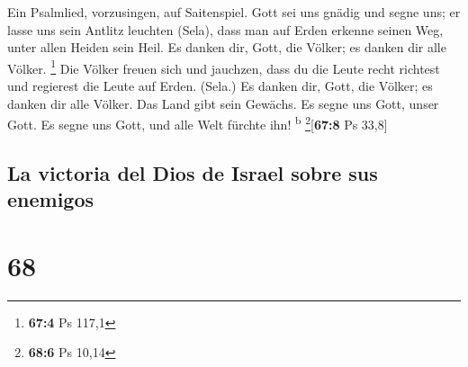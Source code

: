  Ein Psalmlied, vorzusingen, auf Saitenspiel.
 Gott sei uns gnädig und segne uns; er lasse uns sein
Antlitz leuchten (Sela),  dass man auf Erden erkenne
seinen Weg, unter allen Heiden sein Heil.  Es danken dir,
Gott, die Völker; es danken dir alle Völker. \footnote{\textbf{67:4} Ps
  117,1}  Die Völker freuen sich und jauchzen, dass du die
Leute recht richtest und regierest die Leute auf Erden. (Sela.)
 Es danken dir, Gott, die Völker; es danken dir alle
Völker.  Das Land gibt sein Gewächs. Es segne uns Gott,
unser Gott.  Es segne uns Gott, und alle Welt fürchte ihn!
\textsuperscript{b} \footnote{\textbf{68:6} Ps 10,14}{[}\textbf{67:8} Ps
33,8{]}

\hypertarget{la-victoria-del-dios-de-israel-sobre-sus-enemigos}{%
\subsection{La victoria del Dios de Israel sobre sus
enemigos}\label{la-victoria-del-dios-de-israel-sobre-sus-enemigos}}

\hypertarget{section-67}{%
\section{68}\label{section-67}}

